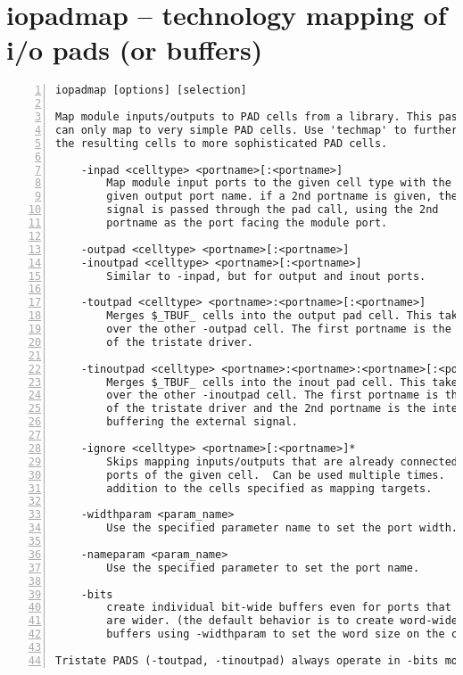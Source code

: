 \section{iopadmap -- technology mapping of i/o pads (or buffers)}
\label{cmd:iopadmap}
\begin{lstlisting}[numbers=left,frame=single]
    iopadmap [options] [selection]

Map module inputs/outputs to PAD cells from a library. This pass
can only map to very simple PAD cells. Use 'techmap' to further map
the resulting cells to more sophisticated PAD cells.

    -inpad <celltype> <portname>[:<portname>]
        Map module input ports to the given cell type with the
        given output port name. if a 2nd portname is given, the
        signal is passed through the pad call, using the 2nd
        portname as the port facing the module port.

    -outpad <celltype> <portname>[:<portname>]
    -inoutpad <celltype> <portname>[:<portname>]
        Similar to -inpad, but for output and inout ports.

    -toutpad <celltype> <portname>:<portname>[:<portname>]
        Merges $_TBUF_ cells into the output pad cell. This takes precedence
        over the other -outpad cell. The first portname is the enable input
        of the tristate driver.

    -tinoutpad <celltype> <portname>:<portname>:<portname>[:<portname>]
        Merges $_TBUF_ cells into the inout pad cell. This takes precedence
        over the other -inoutpad cell. The first portname is the enable input
        of the tristate driver and the 2nd portname is the internal output
        buffering the external signal.

    -ignore <celltype> <portname>[:<portname>]*
        Skips mapping inputs/outputs that are already connected to given
        ports of the given cell.  Can be used multiple times.  This is in
        addition to the cells specified as mapping targets.

    -widthparam <param_name>
        Use the specified parameter name to set the port width.

    -nameparam <param_name>
        Use the specified parameter to set the port name.

    -bits
        create individual bit-wide buffers even for ports that
        are wider. (the default behavior is to create word-wide
        buffers using -widthparam to set the word size on the cell.)

Tristate PADS (-toutpad, -tinoutpad) always operate in -bits mode.
\end{lstlisting}

